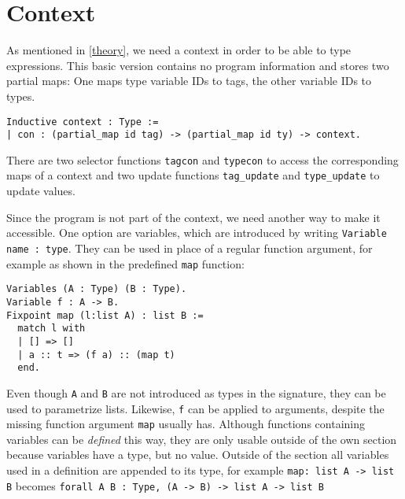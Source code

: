 \documentclass[fleqn]{scrreprt}
\newcommand{\coqinline}[1]{\texttt{#1}}
\begin{document}
\section{Context}
As mentioned in \autoref{theory}, we need a context in order to be able to type expressions. This basic version contains no program information and stores two partial maps: One maps type variable IDs to tags, the other variable IDs to types. 
\begin{verbatim}
Inductive context : Type := 
| con : (partial_map id tag) -> (partial_map id ty) -> context.
\end{verbatim}
There are two selector functions \coqinline{tagcon} and \coqinline{typecon} to access the corresponding maps of a context and two update functions \coqinline{tag_update} and \coqinline{type_update} to update values.
\par
Since the program is not part of the context, we need another way to make it accessible. One option are variables, which are introduced by writing \coqinline{Variable name : type}. They can be used in place of a regular function argument, for example as shown in the predefined \coqinline{map} function:
\begin{verbatim}
Variables (A : Type) (B : Type).
Variable f : A -> B.
Fixpoint map (l:list A) : list B :=
  match l with
  | [] => []
  | a :: t => (f a) :: (map t)
  end.
\end{verbatim}
Even though \coqinline{A} and \coqinline{B} are not introduced as types in the signature, they can be used to parametrize lists. Likewise, \coqinline{f} can be applied to arguments, despite the missing function argument \coqinline{map} usually has. Although functions containing variables can be \textit{defined} this way, they are only usable outside of the own section because variables have a type, but no value. Outside of the section all variables used in a definition are appended to its type, for example \coqinline{map: list A -> list B} becomes \coqinline{forall A B : Type, (A -> B) -> list A -> list B}
\end{document}
